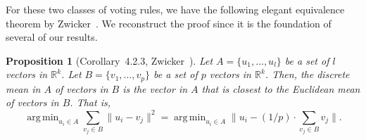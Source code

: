 \documentclass[10pt,letterpaper]{article}
\DeclareMathOperator*{\argmin}{arg\,min}
\newtheorem{proposition}{Proposition}
\begin{document}

For these two classes of voting rules, we have the following elegant equivalence theorem by Zwicker~\cite{Zwicker08a}. We reconstruct the proof since it is the foundation of several of our results.

\begin{proposition}[Corollary~4.2.3, Zwicker~\cite{Zwicker08a}]
Let $A = \{u_1,\ldots,u_l\}$ be a set of $l$ vectors in $\mathbb{R}^k$. Let $B = \{v_1,\ldots,v_p\}$ be a set of $p$ vectors in $\mathbb{R}^k$. Then, the discrete mean in $A$ of vectors in $B$ is the vector in $A$ that is closest to the Euclidean mean of vectors in $B$. That is,
$$
\argmin_{u_i \in A} \sum_{v_j \in B} \|u_i - v_j\|^2 = \argmin_{u_i \in A} \|u_i - (1/p) \cdot \sum_{v_j \in B} v_j\|.
$$
\label{prop:discrete-mean}
\end{proposition}
\end{document}
